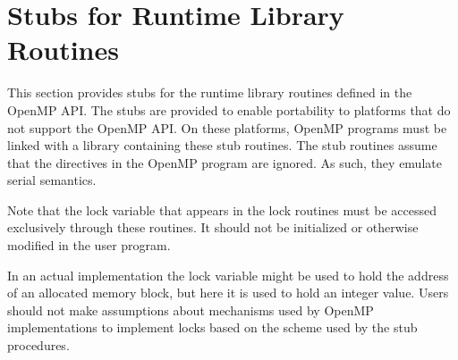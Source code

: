 %
%
%
%
%
%
%
%
%
%


\chapter{Stubs for Runtime Library Routines}
\label{chap:Stubs for Runtime Library Routines}
\label{chap:Appendix A}
This section provides stubs for the runtime library routines defined in the OpenMP API. 
The stubs are provided to enable portability to platforms that do not support the 
OpenMP API. On these platforms, OpenMP programs must be linked with a library 
containing these stub routines. The stub routines assume that the directives in the 
OpenMP program are ignored. As such, they emulate serial semantics.

Note that the lock variable that appears in the lock routines must be accessed 
exclusively through these routines. It should not be initialized or otherwise modified in 
the user program. 

In an actual implementation the lock variable might be used to hold the address of an 
allocated memory block, but here it is used to hold an integer value. Users should not 
make assumptions about mechanisms used by OpenMP implementations to implement 
locks based on the scheme used by the stub procedures.

